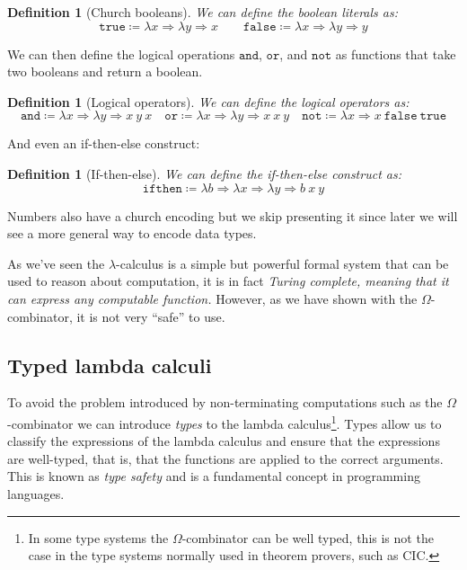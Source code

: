 \documentclass[
  a4paper, 
  10pt, 
  parskip=half, 
  DIV=20,
  toc=bibliography,
  usegeometry,
]{scrartcl}
\newtheorem{definition}[theorem]{Definition}
\renewcommand{\mapsto}{\Rightarrow}
\begin{document}
\begin{definition}[Church booleans]
  We can define the boolean literals as:
  \[
    \texttt{true} \coloneqq \lambda x \mapsto \lambda y \mapsto x \qquad
    \texttt{false} \coloneqq \lambda x \mapsto \lambda y \mapsto y 
  \]
\end{definition}

We can then define the logical operations \(\texttt{and}\), \(\texttt{or}\), and
\(\texttt{not}\) as functions that take two booleans and return a boolean.

\begin{definition}[Logical operators]
  We can define the logical operators as:
  \[
    \texttt{and} \coloneqq \lambda x \mapsto \lambda y \mapsto x \ y \ x \quad
    \texttt{or} \coloneqq \lambda x \mapsto \lambda y \mapsto x \ x \ y \quad
    \texttt{not} \coloneqq \lambda x \mapsto x \ \texttt{false} \ \texttt{true} 
  \]
\end{definition}

And even an if-then-else construct:

\begin{definition}[If-then-else]
  We can define the if-then-else construct as:
  \[
  \texttt{ifthen} \coloneqq \lambda b \mapsto \lambda x \mapsto \lambda y \mapsto b \ x \ y 
  \]
\end{definition}

Numbers also have a church encoding but we skip presenting it since later we 
will see a more general way to encode data types.

As we've seen the \(\lambda\)-calculus is a simple but powerful formal system
that can be used to reason about computation, it is in fact \emph{Turing complete,
meaning that it can express any computable function.} However, as we have 
shown with the \(\Omega\)-combinator, it is not very \enquote{safe} to use.

\subsection{Typed lambda calculi}

To avoid the problem introduced by non-terminating computations such as the 
\(\Omega\)-combinator we can introduce \emph{types} to the lambda calculus\footnote{
  In some type systems the \(\Omega\)-combinator can be well typed, this is not
  the case in the type systems normally used in theorem provers, such as CIC.
}. 
Types allow us to classify the expressions
of the lambda calculus and ensure that the expressions are well-typed, that is,
that the functions are applied to the correct arguments. This is known as
\emph{type safety} and is a fundamental concept in programming languages.
\end{document}
